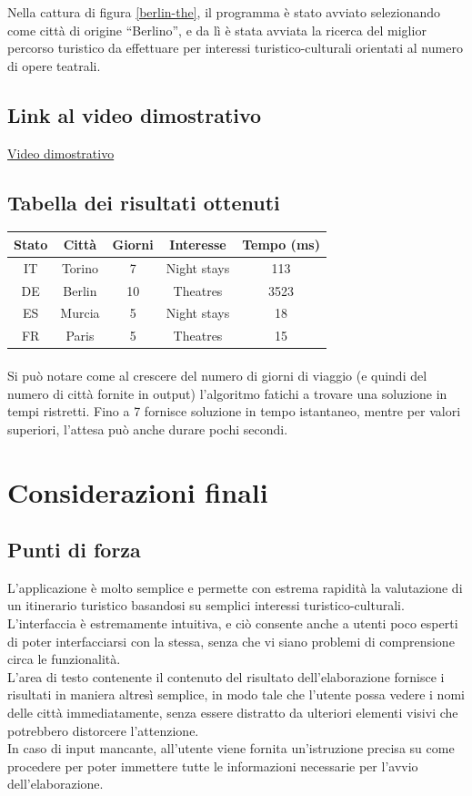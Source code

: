 \documentclass[12pt, a4paper]{article}
\begin{document}
 Nella cattura di figura \ref{berlin-the}, il programma è stato avviato selezionando come città di origine “Berlino”, e da lì è stata avviata la ricerca del miglior percorso turistico da effettuare per interessi turistico-culturali orientati al numero di opere teatrali.
	
	\subsection{Link al video dimostrativo}
\href{	https://youtu.be/YXR59W2VvJ4 } {Video dimostrativo}
	
	\subsection{Tabella dei risultati ottenuti}
	\begin{tabular}{|c|c|c|c|c|}
		\hline
		Stato & Città & Giorni  & Interesse & Tempo (ms)  \\
		\hline
		IT &Torino  & 7  & Night stays  & 113   \\
		\hline
		DE & Berlin  & 10  & Theatres  & 3523 \\
		\hline
		ES & Murcia  & 5  & Night stays  & 18 \\
		\hline
		FR & Paris  & 5  & Theatres & 15  \\
		\hline
	\end{tabular}

\paragraph{}
Si può notare come al crescere del numero di giorni di viaggio (e quindi del numero di città fornite in output) l'algoritmo fatichi a trovare una soluzione in tempi ristretti. Fino a 7 fornisce soluzione in tempo istantaneo, mentre per valori superiori, l'attesa può anche durare pochi secondi. 
	
	\newpage
	\section{Considerazioni finali}
	\subsection{Punti di forza}
	L'applicazione è molto semplice e permette con estrema rapidità la valutazione di un itinerario turistico basandosi su semplici interessi turistico-culturali.\\L'interfaccia è estremamente intuitiva, e ciò consente anche a utenti poco esperti di poter interfacciarsi con la stessa, senza che vi siano problemi di comprensione circa le funzionalità.\\L'area di testo contenente il contenuto del risultato dell'elaborazione fornisce i risultati in maniera altresì semplice, in modo tale che l'utente possa vedere i nomi delle città immediatamente, senza essere distratto da ulteriori elementi visivi che potrebbero distorcere l'attenzione.\\In caso di input mancante, all'utente viene fornita un'istruzione precisa su come procedere per poter immettere tutte le informazioni necessarie per l'avvio dell'elaborazione.
\end{document}
